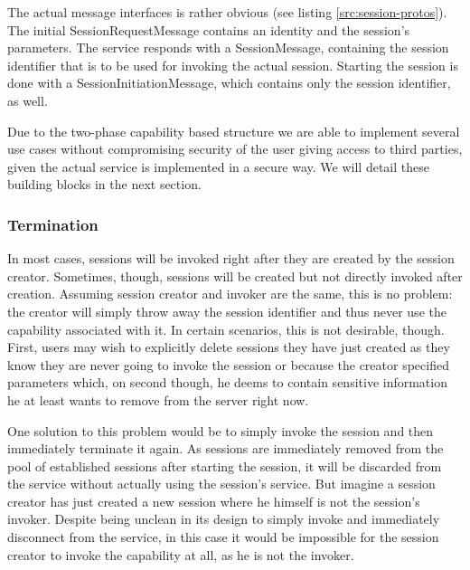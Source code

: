 The actual message interfaces is rather obvious (see listing \ref{src:session-protos}).
The initial SessionRequestMessage contains an identity and the session's parameters.
The service responds with a SessionMessage, containing the session identifier that is to be used for invoking the actual session.
Starting the session is done with a SessionInitiationMessage, which contains only the session identifier, as well.



Due to the two-phase capability based structure we are able to implement several use cases without compromising security of the user giving access to third parties, given the actual service is implemented in a secure way.
We will detail these building blocks in the next section.

\subsubsection{Termination}

In most cases, sessions will be invoked right after they are created by the session creator.
Sometimes, though, sessions will be created but not directly invoked after creation.
Assuming session creator and invoker are the same, this is no problem: the creator will simply throw away the session identifier and thus never use the capability associated with it.
In certain scenarios, this is not desirable, though.
First, users may wish to explicitly delete sessions they have just created as they know they are never going to invoke the session or because the creator specified parameters which, on second though, he deems to contain sensitive information he at least wants to remove from the server right now.

One solution to this problem would be to simply invoke the session and then immediately terminate it again.
As sessions are immediately removed from the pool of established sessions after starting the session, it will be discarded from the service without actually using the session's service.
But imagine a session creator has just created a new session where he himself is not the session's invoker.
Despite being unclean in its design to simply invoke and immediately disconnect from the service, in this case it would be impossible for the session creator to invoke the capability at all, as he is not the invoker.

